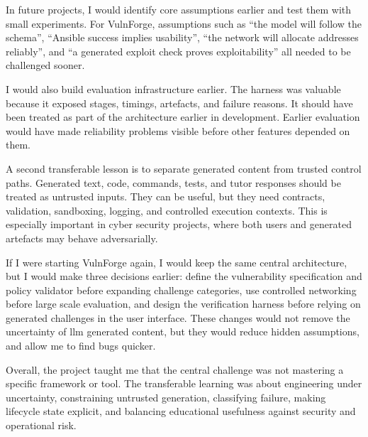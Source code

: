 In future projects, I would identify core assumptions earlier and test them with small experiments. For VulnForge, assumptions such as ``the model will follow the schema'', ``Ansible success implies usability'', ``the network will allocate addresses reliably'', and ``a generated exploit check proves exploitability'' all needed to be challenged sooner.

I would also build evaluation infrastructure earlier. The harness was valuable because it exposed stages, timings, artefacts, and failure reasons. It should have been treated as part of the architecture earlier in development. Earlier evaluation would have made reliability problems visible before other features depended on them.

A second transferable lesson is to separate generated content from trusted control paths. Generated text, code, commands, tests, and tutor responses should be treated as untrusted inputs. They can be useful, but they need contracts, validation, sandboxing, logging, and controlled execution contexts. This is especially important in cyber security projects, where both users and generated artefacts may behave adversarially.

If I were starting VulnForge again, I would keep the same central architecture, but I would make three decisions earlier: define the vulnerability specification and policy validator before expanding challenge categories, use controlled networking before large scale evaluation, and design the verification harness before relying on generated challenges in the user interface. These changes would not remove the uncertainty of \gls{llm} generated content, but they would reduce hidden assumptions, and allow me to find bugs quicker.

Overall, the project taught me that the central challenge was not mastering a specific framework or tool. The transferable learning was about engineering under uncertainty, constraining untrusted generation, classifying failure, making lifecycle state explicit, and balancing educational usefulness against security and operational risk.
